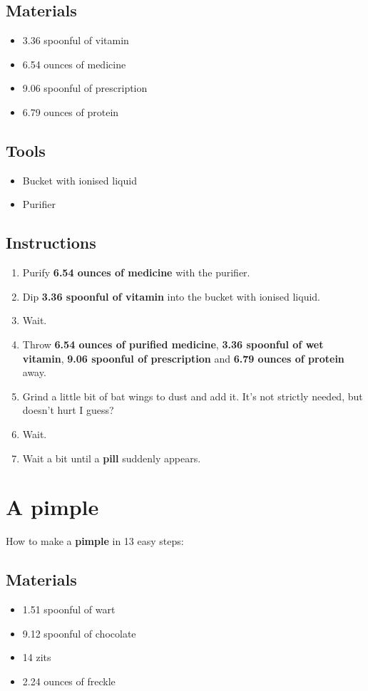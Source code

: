 \documentclass{article}
\begin{document}
\subsection{Materials}\begin{itemize}
\item 
3.36 spoonful of vitamin
\item 
6.54 ounces of medicine
\item 
9.06 spoonful of prescription
\item 
6.79 ounces of protein
\end{itemize}
\subsection{Tools}\begin{itemize}
\item 
Bucket with ionised liquid
\item 
Purifier
\end{itemize}
\subsection{Instructions}\begin{enumerate}
\item 
Purify \textbf{6.54 ounces of medicine} with the purifier.
\item 
Dip \textbf{3.36 spoonful of vitamin} into the bucket with ionised liquid.
\item 
Wait.
\item 
Throw \textbf{6.54 ounces of purified medicine}, \textbf{3.36 spoonful of wet vitamin}, \textbf{9.06 spoonful of prescription} and \textbf{6.79 ounces of protein} away.
\item 
Grind a little bit of bat wings to dust and add it. It's not strictly needed, but doesn't hurt I guess?
\item 
Wait.
\item 
Wait a bit until a \textbf{pill} suddenly appears.
\end{enumerate}
\newpage
\section{A pimple}How to make a \textbf{pimple} in 13 easy steps:

\subsection{Materials}\begin{itemize}
\item 
1.51 spoonful of wart
\item 
9.12 spoonful of chocolate
\item 
14 zits
\item 
2.24 ounces of freckle
\end{itemize}
\end{document}
